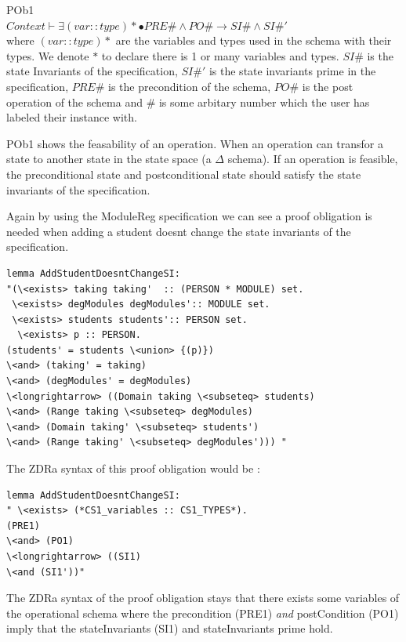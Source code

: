 \begin{defin}\label{defa}POb1\\

$Context \vdash \exists (var::type)* \bullet PRE\# \land PO\# \longrightarrow SI\# \land SI\#'$\\

\noindent where $(var::type)*$ are the variables and types used in the schema with their types. We denote $*$ to declare there is 1 or many variables and types. $SI\#$ is the state Invariants of the specification, $SI\#'$ is the state invariants prime in the specification, $PRE\#$ is the precondition of the schema, $PO\#$ is the post operation of the schema and $\#$ is some arbitary number which the user has labeled their instance with.
\end{defin}

POb1 shows the feasability of an operation. When an operation can transfor a state to another state in the state space (a $\Delta$ schema). If an operation is feasible, the preconditional state and postconditional state should satisfy the state invariants of the specification.

Again by using the ModuleReg specification we can see a proof obligation is needed when adding a student doesnt change the state invariants of the specification.

\begin{verbatim}
lemma AddStudentDoesntChangeSI:
"(\<exists> taking taking'  :: (PERSON * MODULE) set.
 \<exists> degModules degModules':: MODULE set.
 \<exists> students students':: PERSON set.
  \<exists> p :: PERSON.
(students' = students \<union> {(p)}) 
\<and> (taking' = taking)
\<and> (degModules' = degModules)
\<longrightarrow> ((Domain taking \<subseteq> students)
\<and> (Range taking \<subseteq> degModules)
\<and> (Domain taking' \<subseteq> students')
\<and> (Range taking' \<subseteq> degModules'))) "
\end{verbatim}

The ZDRa syntax of this proof obligation would be :

\begin{verbatim}
lemma AddStudentDoesntChangeSI:
" \<exists> (*CS1_variables :: CS1_TYPES*).
(PRE1)
\<and> (PO1)
\<longrightarrow> ((SI1)
\<and (SI1'))"
\end{verbatim}

 The ZDRa syntax of the proof obligation stays that there exists some variables of the operational schema where the precondition (PRE1) \emph{and} postCondition (PO1) imply that the stateInvariants (SI1) and stateInvariants prime hold.

